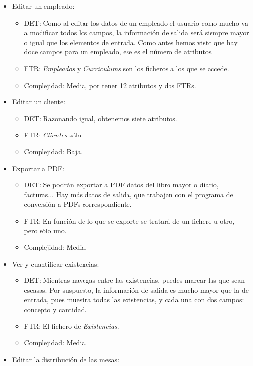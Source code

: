 \documentclass[spanish,a4paper,12pt]{report}	%
\begin{document}
	\begin{itemize}
		\item{Editar un empleado:} 
		\begin{itemize}
 			\item{DET:} Como al editar los datos de un empleado el usuario como mucho va a modificar todos los campos, la información de salida será siempre mayor o igual que los elementos de entrada. Como antes hemos visto que hay doce campos  para un empleado, ese es el número de atributos.
			\item{FTR:} \textit{Empleados} y \textit{Curriculums} son los ficheros a los que se accede.
			\item{Complejidad:} Media, por tener 12 atributos y dos FTRs.
		\end{itemize}
		\item{Editar un cliente:} 
		\begin{itemize}
 			\item{DET:} Razonando igual, obtenemos siete atributos.
			\item{FTR:} \textit{Clientes} sólo.
			\item{Complejidad:} Baja.
		\end{itemize}
		\item{Exportar a PDF:} 
		\begin{itemize}
 			\item{DET:} Se podrán exportar a PDF datos del libro mayor o diario, facturas... Hay más datos de salida, que trabajan con el programa de conversión a PDFs correspondiente.
			\item{FTR:} En función de lo que se exporte se tratará de un fichero u otro, pero sólo uno.
			\item{Complejidad:} Media.
		\end{itemize}
		\item{Ver y cuantificar existencias:} 
		\begin{itemize}
 			\item{DET:} Mientras navegas entre las existencias, puedes marcar las que sean escasas. Por suspuesto, la información de salida es mucho mayor que la de entrada, pues muestra todas las existencias, y cada una con dos campos: concepto y cantidad. 
			\item{FTR:} El fichero de \textit{Existencias}.
			\item{Complejidad:} Media.
		\end{itemize}
		\item{Editar la distribución de las mesas:} 
		\begin{itemize}

\end{itemize}
\end{itemize}
\end{document}
